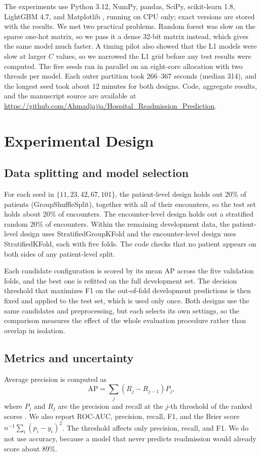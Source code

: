 \documentclass[conference]{IEEEtran}
\begin{document}
The experiments use Python 3.12, NumPy, pandas, SciPy, scikit-learn 1.8, LightGBM 4.7, and Matplotlib \cite{numpy,pandas,scipy,sklearn,lgbm,mpl}, running on CPU only; exact versions are stored with the results. We met two practical problems. Random forest was slow on the sparse one-hot matrix, so we pass it a dense 32-bit matrix instead, which gives the same model much faster. A timing pilot also showed that the L1 models were slow at larger $C$ values, so we narrowed the L1 grid before any test results were computed. The five seeds ran in parallel on an eight-core allocation with two threads per model. Each outer partition took 266--367 seconds (median 314), and the longest seed took about 12 minutes for both designs. Code, aggregate results, and the manuscript source are available at\\
\url{https://github.com/Ahmadjajja/Hospital_Readmission_Prediction}.

\section{Experimental Design}
\subsection{Data splitting and model selection}
For each seed in $\{11,23,42,67,101\}$, the patient-level design holds out 20\% of patients (GroupShuffleSplit), together with all of their encounters, so the test set holds about 20\% of encounters. The encounter-level design holds out a stratified random 20\% of encounters. Within the remaining development data, the patient-level design uses StratifiedGroupKFold and the encounter-level design uses StratifiedKFold, each with five folds. The code checks that no patient appears on both sides of any patient-level split.

Each candidate configuration is scored by its mean AP across the five validation folds, and the best one is refitted on the full development set. The decision threshold that maximizes F1 on the out-of-fold development predictions is then fixed and applied to the test set, which is used only once. Both designs use the same candidates and preprocessing, but each selects its own settings, so the comparison measures the effect of the whole evaluation procedure rather than overlap in isolation.

\subsection{Metrics and uncertainty}
Average precision is computed as
\begin{equation}
\mathrm{AP}=\sum_j (R_j-R_{j-1})P_j,
\end{equation}
where $P_j$ and $R_j$ are the precision and recall at the $j$-th threshold of the ranked scores \cite{apdoc}. We also report ROC-AUC, precision, recall, F1, and the Brier score $n^{-1}\sum_i(p_i-y_i)^2$. The threshold affects only precision, recall, and F1. We do not use accuracy, because a model that never predicts readmission would already score about 89\%.
\end{document}

